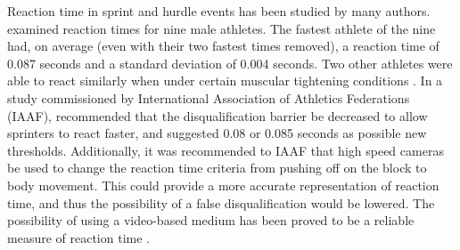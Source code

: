 \documentclass[12pt, letterpaper, titlepage]{article}
\begin{document}
Reaction time in sprint and hurdle events has been studied by many authors.
\citet{pain2007sprint} examined
reaction times for nine male athletes.  The
fastest athlete of the nine had, on average (even with their two fastest times 
removed), a reaction time of 0.087 seconds and a standard deviation of 0.004
seconds.  Two other athletes were able to react similarly when under certain
muscular tightening conditions \citep{pain2007sprint}. 
In a study commissioned by International Association of Athletics Federations 
(IAAF), \citet{komi2009iaaf} recommended that the disqualification 
barrier be decreased to allow sprinters to
react faster, and suggested 0.08 or 0.085 seconds as possible new thresholds.
Additionally, it was recommended to IAAF that high speed cameras be used to
change the reaction time criteria from pushing off on the block to body
movement. This could provide a more accurate representation of reaction time, 
and thus the possibility of a false disqualification would be lowered.
The possibility of using a video-based medium has been proved to be a reliable
measure of reaction time \citep{mudric2015evaluation}.
\end{document}
